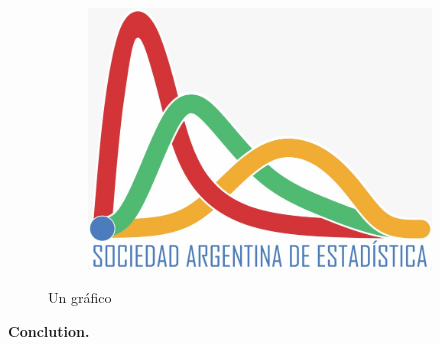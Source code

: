 \documentclass[a0,portrait]{a0poster} %
\begin{document}
\begin{multicols}{2}
\columnbreak



\justify

\lipsum[4]

\vspace{1cm}
\begin{figure}[H]
\centering
\begin{subfigure}[b]{1\linewidth}
    \centering
    \includegraphics[width=.4\linewidth]{../../logos/sae}
\end{subfigure}
\caption{Un gráfico}
\end{figure}

\lipsum[5]


\vspace{1cm}
\textbf{Conclution.}
\lipsum[5]


\vspace{1cm}
{ \small
\nocite{*} %
}


\end{multicols}
\end{document}
